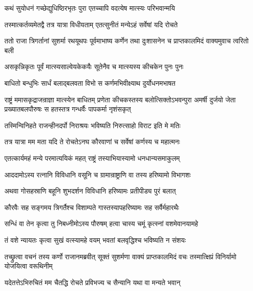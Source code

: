 \twolineshloka
{कथं सुयोधनं गच्छेद्युधिष्ठिरभृतः पुरा}
{एतच्चापि वदत्येष मात्स्यः परिभवान्मयि}


\twolineshloka
{तस्मात्कर्तव्यमेतद्वै तत्र यात्रा विधीयताम्}
{एतत्सुनीतं मन्येऽहं सर्वेषां यदि रोचते}



\threelineshloka
{ततो राजा त्रिगर्तानां सुशर्मा रथयूथपः}
{पूर्वमाभाष्य कर्णेन तथा दुःशासनेन च}
{प्राप्तकालमिदं वाक्यमुवाच त्वरितो बली}


\twolineshloka
{असकृन्निकृतः पूर्वं मात्स्यसाल्वेयकेकयैः}
{सूतेनैव च मात्स्यस्य कीचकेन पुनः पुनः}


\twolineshloka
{बाधितो बन्धुभिः सार्धं बलाद्बलवता विभो}
{स कर्णमभिवीक्ष्याथ दुर्योधनमभाषत}


\onelineshloka
{राष्ट्रं ममासकृद्राजन्राज्ञा मात्स्येन बाधितम्}
\threelineshloka
{प्रणेता कीचकस्तस्य बलोत्सिक्तोऽभवन्पुरा}
{अमर्षी दुर्जयो जेता प्रख्यातबलपौरुषः}
{स हतस्तत्र गन्धर्वैः पापकर्मा नृशंसकृत्}


\twolineshloka
{तस्मिन्विनिहते राजन्हीनदर्पो निराश्रयः}
{भविष्यति निरुत्साहो विराट इति मे मतिः}


\twolineshloka
{तत्र यात्रा मम मता यदि ते रोचतेऽनघ}
{कौरवाणां च सर्वेषां कर्णस्य च महात्मनः}


\twolineshloka
{एतत्कार्यमहं मन्ये परमात्ययिकं महत्}
{राष्ट्रं तस्याभियास्यामो धनधान्यसमाकुलम्}


\twolineshloka
{आददामोऽस्य रत्नानि विविधानि वसूनि च}
{ग्रामान्राष्ट्राणि वा तस्य हरिष्यामो विभागशः}


\twolineshloka
{अथवा गोसहस्राणि बहूनि शुभदर्शन}
{विविधानि हरिष्यामः प्रतीपीड्य पुरं बलात्}


\twolineshloka
{कौरवैः सह सङ्गमय त्रिगर्तैश्च विशाम्पते}
{गास्तस्यापहरिष्यामः सह सर्वैर्महारथैः}


\twolineshloka
{सन्धिं वा तेन कृत्वा तु निबध्नीमोऽस्य पौरुषम्}
{हत्वा चास्य चमूं कृत्स्नां वशमेवानयामहे}


\twolineshloka
{तं वशे न्यायतः कृत्वा सुखं वत्स्यामहे वयम्}
{भवतां बलवृद्धिश्च भविष्यति न संशयः}



\onelineshloka
{तच्छ्रुत्वा वचनं तस्य कर्णो राजानमब्रवीत्}
\twolineshloka
{सूक्तं सुशर्मणा वाक्यं प्राप्तकालमिदं वचः}
{तस्मात्क्षिप्रं विनिर्यामो योजयित्वा वरूथिनीम्}


\twolineshloka
{यदेतत्तेऽभिरुचितं मम चैतद्धि रोचते}
{प्रविभज्य च सैन्यानि यथा वा मन्यते भवान्}





